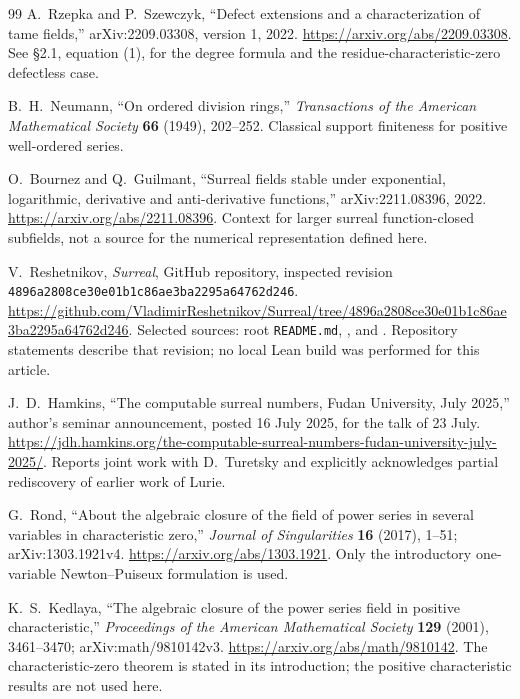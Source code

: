 \documentclass[11pt,letterpaper]{article}
\numberwithin{equation}{section}
\theoremstyle{definition}
\theoremstyle{remark}
\begin{document}
\begin{thebibliography}{99}
A.~Rzepka and P.~Szewczyk, ``Defect extensions and a characterization of
tame fields,'' arXiv:2209.03308, version 1, 2022.
\url{https://arxiv.org/abs/2209.03308}.
See \S2.1, equation (1), for the degree formula and the
residue-characteristic-zero defectless case.

B.~H.~Neumann, ``On ordered division rings,'' \emph{Transactions of the
American Mathematical Society} \textbf{66} (1949), 202--252.
Classical support finiteness for positive well-ordered series.

O.~Bournez and Q.~Guilmant, ``Surreal fields stable under exponential,
logarithmic, derivative and anti-derivative functions,''
arXiv:2211.08396, 2022.
\url{https://arxiv.org/abs/2211.08396}.
Context for larger surreal function-closed subfields, not a source for the
numerical representation defined here.

V.~Reshetnikov, \emph{Surreal}, GitHub repository, inspected revision
\texttt{4896a2808ce30e01b1c86ae3ba2295a64762d246}.
\url{https://github.com/VladimirReshetnikov/Surreal/tree/4896a2808ce30e01b1c86ae3ba2295a64762d246}.
Selected sources: root \texttt{README.md},
, and
. Repository statements describe
that revision; no local Lean build was performed for this article.


J.~D.~Hamkins, ``The computable surreal numbers, Fudan University, July 2025,''
author's seminar announcement, posted 16 July 2025, for the talk of 23 July.
\url{https://jdh.hamkins.org/the-computable-surreal-numbers-fudan-university-july-2025/}.
Reports joint work with D.~Turetsky and explicitly acknowledges partial
rediscovery of earlier work of Lurie.

G.~Rond, ``About the algebraic closure of the field of power series in several
variables in characteristic zero,'' \emph{Journal of Singularities}
\textbf{16} (2017), 1--51; arXiv:1303.1921v4.
\url{https://arxiv.org/abs/1303.1921}.
Only the introductory one-variable Newton--Puiseux formulation is used.

K.~S.~Kedlaya, ``The algebraic closure of the power series field in positive
characteristic,'' \emph{Proceedings of the American Mathematical Society}
\textbf{129} (2001), 3461--3470; arXiv:math/9810142v3.
\url{https://arxiv.org/abs/math/9810142}.
The characteristic-zero theorem is stated in its introduction; the positive
characteristic results are not used here.


\end{thebibliography}
\end{document}
